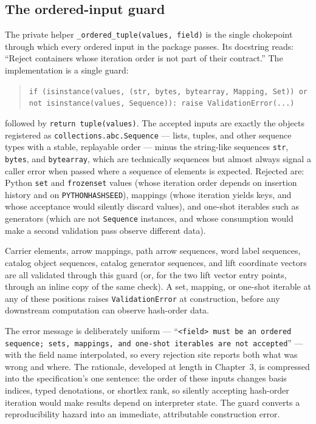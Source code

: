 \subsection{The ordered-input guard}\label{ch09:sec:ordered-tuple}

The private helper \texttt{\_ordered\_tuple(values, field)} is the single
chokepoint through which every ordered input in the package passes. Its
docstring reads: ``Reject containers whose iteration order is not part of
their contract.'' The implementation is a single guard:

\begin{quote}
\texttt{if (isinstance(values, (str, bytes, bytearray, Mapping, Set)) or not isinstance(values, Sequence)): raise ValidationError(...)}
\end{quote}

followed by \texttt{return tuple(values)}. The accepted inputs are exactly
the objects registered as \texttt{collections.abc.Sequence} --- lists,
tuples, and other sequence types with a stable, replayable order --- minus
the string-like sequences \texttt{str}, \texttt{bytes}, and
\texttt{bytearray}, which are technically sequences but almost always
signal a caller error when passed where a sequence of elements is expected.
Rejected are: Python \texttt{set} and \texttt{frozenset} values (whose
iteration order depends on insertion history and on
\texttt{PYTHONHASHSEED}), mappings (whose iteration yields keys, and whose
acceptance would silently discard values), and one-shot iterables such as
generators (which are not \texttt{Sequence} instances, and whose consumption
would make a second validation pass observe different data).

\begin{ruleenv}\label{ch09:rule:ordered}
Carrier elements, arrow mappings, path arrow sequences, word label
sequences, catalog object sequences, catalog generator sequences, and lift
coordinate vectors are all validated through this guard (or, for the two
lift vector entry points, through an inline copy of the same check).
A set, mapping, or one-shot iterable at any of these positions raises
\texttt{ValidationError} at construction, before any downstream computation
can observe hash-order data.
\end{ruleenv}

The error message is deliberately uniform --- ``\texttt{<field> must be an
ordered sequence; sets, mappings, and one-shot iterables are not
accepted}'' --- with the field name interpolated, so every rejection site
reports both what was wrong and where. The rationale, developed at length in
Chapter~3, is compressed into the specification's one sentence: the order of
these inputs changes basis indices, typed denotations, or shortlex rank, so
silently accepting hash-order iteration would make results depend on
interpreter state. The guard converts a reproducibility hazard into an
immediate, attributable construction error.

